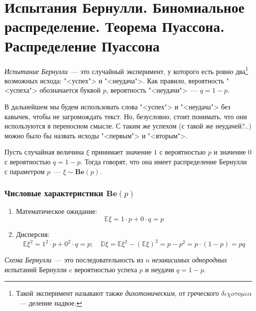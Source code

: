 \section {Испытания Бернулли. Биномиальное распределение. Теорема Пуассона. Распределение Пуассона}
\begin{defn}
    \textit{Испытание Бернулли}~--- это случайный эксперимент, у которого есть ровно два\footnote{Такой эксперимент называют также \textit{дихотомическим}, от греческого $\delta \iota \chi o \tau o \mu \iota \alpha$~--- деление надвое.}
    возможных исхода: "<успех"> и "<неудача">. 
    Как правило, вероятность "<успеха"> обозначается буквой $p$, вероятность "<неудачи">~--- $q = 1 - p$.
\end{defn}

\begin{rmrk}
    В дальнейшем мы будем использовать слова "<успех"> и "<неудача"> без кавычек, чтобы не загромождать текст. 
    Но, безусловно, стоит понимать, что они используются в переносном смысле. 
    С таким же успехом (с такой же неудачей?..) можно было бы назвать исходы "<первым"> и "<вторым">.
\end{rmrk}

\begin{defn}
    Пусть случайная величина $\xi$ принимает значение $1$ с вероятностью $p$ и значение $0$ с вероятностью $q = 1 -p$.
    Тогда говорят, что она имеет распределение Бернулли с параметром $p$~--- $\xi \sim \mathbf{Be}(p)$.
\end{defn}

\subsubsection{Числовые характеристики $\mathbf{Be}(p)$}
\begin{enumerate}
    \item Математическое ожидание:
    \begin{equation*}
        \mathbb{E}\xi =  1 \cdot p + 0 \cdot q = p
    \end{equation*}
    \item Дисперсия:
        $$\mathbb{E}\xi^2 = 1^2 \cdot p + 0^2 \cdot q = p; \quad \mathbb{D}\xi = \mathbb{E}\xi^2 - (\mathbb{E}\xi)^2 = p - p^2 = p \cdot (1 - p) = pq$$
\end{enumerate}

\begin{defn}
    \textit{Схема Бернулли}~--- это последовательность из $n$ \textit{независимых однородных} испытаний Бернулли c вероятностью успеха $p$ и неудачи $q = 1 - p$.
\end{defn}

